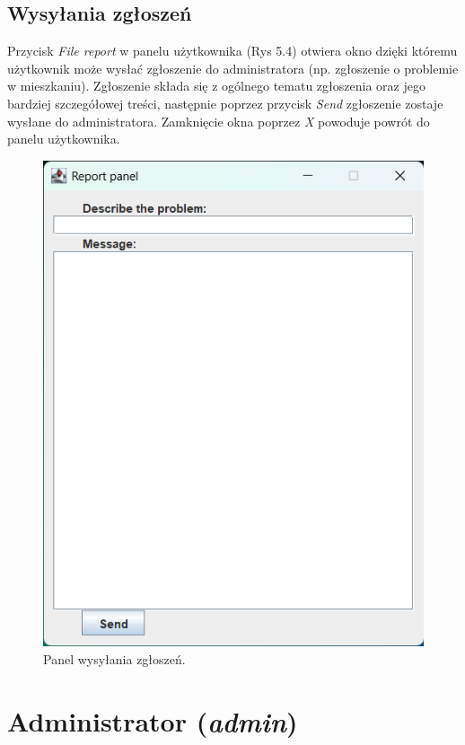 \subsection{Wysyłania zgłoszeń}
Przycisk \textit{File report} w panelu użytkownika (Rys 5.4) otwiera okno dzięki któremu użytkownik może wysłać zgłoszenie do administratora 
(np. zgłoszenie o problemie w mieszkaniu). Zgłoszenie składa się z ogólnego tematu zgłoszenia oraz jego bardziej szczegółowej treści, następnie 
poprzez przycisk \textit{Send} zgłoszenie zostaje wysłane do administratora. Zamknięcie okna poprzez \textit{X} powoduje powrót do panelu użytkownika.
\begin{figure}[H]
    \centering
    \includegraphics[width=\textwidth,height=0.5\textheight,keepaspectratio]{figures/app-images/user-file-report.png}
    \caption{Panel wysyłania zgłoszeń.\label{fig10}}
\end{figure}

\newpage
\section{Administrator (\textit{admin})}
